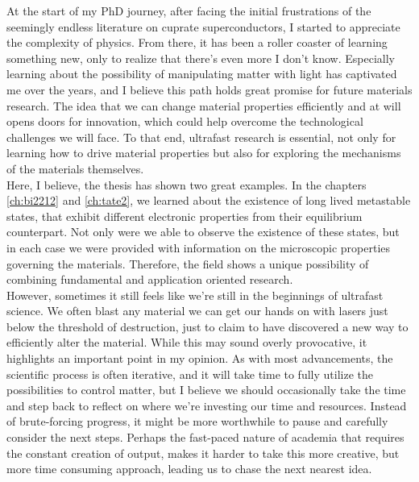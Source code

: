 At the start of my PhD journey, after facing the initial frustrations of the seemingly endless literature on cuprate superconductors, I started to appreciate the complexity of physics.
From there, it has been a roller coaster of learning something new, only to realize that there’s even more I don’t know.
Especially learning about the possibility of manipulating matter with light has captivated me over the years, and I believe this path holds great promise for future materials research.
The idea that we can change material properties efficiently and at will opens doors for innovation, which could help overcome the technological challenges we will face.
To that end, ultrafast research is essential, not only for learning how to drive material properties but also for exploring the mechanisms of the materials themselves.\\
Here, I believe, the thesis has shown two great examples.
In the chapters \ref{ch:bi2212} and \ref{ch:tate2}, we learned about the existence of long lived metastable states, that exhibit different electronic properties from their equilibrium counterpart.
Not only were we able to observe the existence of these states, but in each case we were provided with information on the microscopic properties governing the materials.
Therefore, the field shows a unique possibility of combining fundamental and application oriented research.\\
However, sometimes it still feels like we're still in the beginnings of ultrafast science.
We often blast any material we can get our hands on with lasers just below the threshold of destruction, just to claim to have discovered a new way to efficiently alter the material.
While this may sound overly provocative, it highlights an important point in my opinion.
As with most advancements, the scientific process is often iterative, and it will take time to fully utilize the possibilities to control matter, but I believe we should occasionally take the time and step back to reflect on where we’re investing our time and resources.
Instead of brute-forcing progress, it might be more worthwhile to pause and carefully consider the next steps.
Perhaps the fast-paced nature of academia that requires the constant creation of output, makes it harder to take this more creative, but more time consuming approach, leading us to chase the next nearest idea.\hfill\break

